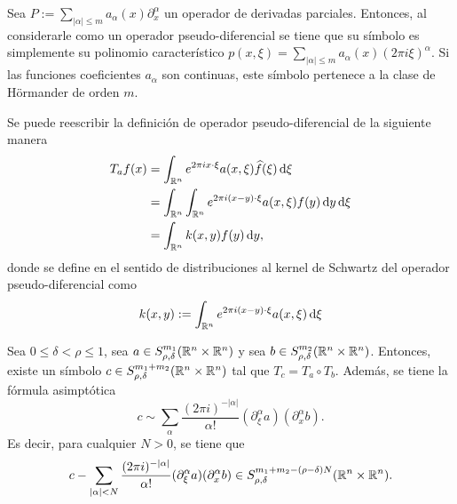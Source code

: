 \begin{example}
	Sea $P:=\sum_{|\alpha|\leq m} a_\alpha(x)\partial^\alpha_x$ un operador de derivadas parciales. Entonces, al considerarle como un operador pseudo-diferencial se tiene que su símbolo es simplemente su polinomio característico $p(x,\xi) = \sum_{|\alpha|\leq m} a_\alpha(x)(2\pi i\xi)^\alpha$. Si las funciones coeficientes $a_\alpha$ son continuas, este símbolo pertenece a la clase de Hörmander de orden $m$.
\end{example}
\begin{remark}
		Se puede reescribir la definición de operador pseudo-diferencial de la siguiente manera
		\begin{align*}
			T_af(x) & = \int_{\mathbb{R}^n} e^{2\pi ix\cdot\xi} a(x, \xi)\widehat{f}(\xi)\mathop{}\!\mathrm{d} \xi\\
			& = \int_{\mathbb{R}^n} \int_{\mathbb{R}^n} e^{2\pi i (x-y)\cdot\xi}a(x, \xi)f(y) \mathop{}\!\mathrm{d} y \mathop{}\!\mathrm{d} \xi\\
			& =\int_{\mathbb{R}^n} k(x, y) f(y)\mathop{}\!\mathrm{d} y,
		\end{align*}
		donde se define en el sentido de distribuciones al kernel de Schwartz del operador pseudo-diferencial como
		\begin{equation*}
			k(x, y) := \int_{\mathbb{R}^n} e^{2\pi i (x-y)\cdot\xi}a(x, \xi) \mathop{}\!\mathrm{d} \xi 
		\end{equation*}
\end{remark}
\begin{theorem}
	Sea $0\leq\delta<\rho\leq1$, sea $a \in S^{m_1}_{\rho,\delta}(\mathbb{R}^n\times\mathbb{R}^n) $ y sea $ b\in S^{m_2}_{\rho,\delta}(\mathbb{R}^n\times\mathbb{R}^n) $. Entonces, existe un símbolo $ c\in S^{m_1+m_2}_{\rho,\delta}(\mathbb{R}^n\times\mathbb{R}^n)$ tal que 
	$T_c = T_a \circ T_b$. Además, se tiene la fórmula asimptótica 
	\begin{equation*}
		c \sim \sum_\alpha \frac{(2\pi i)^{-|\alpha|}}{\alpha!}(\partial^\alpha_\xi a)(\partial^\alpha_x b).
	\end{equation*}
	Es decir, para cualquier $N>0$, se tiene que 
	\begin{equation*}
		c - \sum_{|\alpha|<N} \frac{(2\pi i)^{-|\alpha|}}{\alpha!}(\partial^\alpha_\xi a)(\partial^\alpha_x b) \in S^{m_1+m_2-(\rho-\delta) N}_{\rho,\delta}(\mathbb{R}^n\times\mathbb{R}^n).
	\end{equation*}
\end{theorem}
